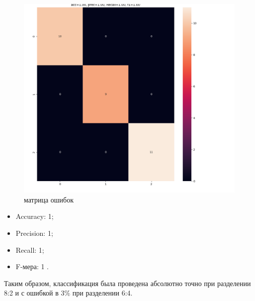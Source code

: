 \documentclass[12pt]{report}
\begin{document}
\begin{figure}[h!]
  \centering
  \includegraphics[width = \linewidth ]{matrix_errors_2.png}
  \caption{матрица ошибок}
  \label{fig:errors_2}
\end{figure}

\begin{itemize}
    \item Accuracy: 1;
    \item Precision: 1;
    \item Recall: 1;
    \item F-мера: 1 .
\end{itemize}

Таким образом, классификация была проведена абсолютно точно при разделении 8:2 и с ошибкой в 3\% при разделении 6:4.

\printbibliography[title={СПИСОК ИСПОЛЬЗОВАННЫХ\\ ИСТОЧНИКОВ}]
\end{document}
